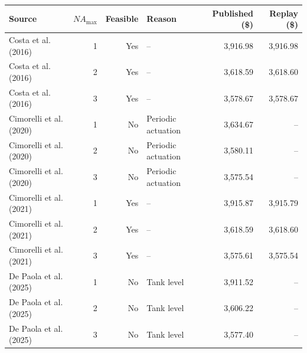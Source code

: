 \begin{tabular}{@{}lrrlrr@{}}
  \hline
  Source & $NA_{\max}$ & Feasible & Reason & Published (\$) & Replay (\$) \\
  \hline
  Costa et al. (2016) & 1 & Yes & -- & 3{,}916.98 & 3{,}916.98 \\
  Costa et al. (2016) & 2 & Yes & -- & 3{,}618.59 & 3{,}618.60 \\
  Costa et al. (2016) & 3 & Yes & -- & 3{,}578.67 & 3{,}578.67 \\
  Cimorelli et al. (2020) & 1 & No & Periodic actuation & 3{,}634.67 & -- \\
  Cimorelli et al. (2020) & 2 & No & Periodic actuation & 3{,}580.11 & -- \\
  Cimorelli et al. (2020) & 3 & No & Periodic actuation & 3{,}575.54 & -- \\
  Cimorelli et al. (2021) & 1 & Yes & -- & 3{,}915.87 & 3{,}915.79 \\
  Cimorelli et al. (2021) & 2 & Yes & -- & 3{,}618.59 & 3{,}618.60 \\
  Cimorelli et al. (2021) & 3 & Yes & -- & 3{,}575.61 & 3{,}575.54 \\
  De Paola et al. (2025) & 1 & No & Tank level & 3{,}911.52 & -- \\
  De Paola et al. (2025) & 2 & No & Tank level & 3{,}606.22 & -- \\
  De Paola et al. (2025) & 3 & No & Tank level & 3{,}577.40 & -- \\
  \hline
\end{tabular}
